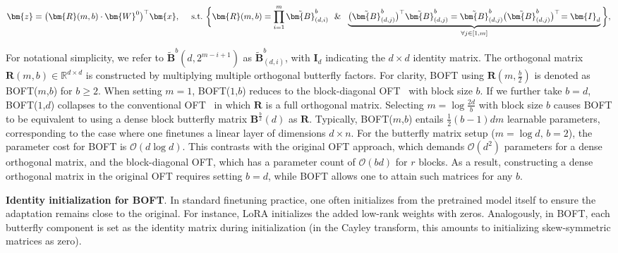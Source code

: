 \begin{equation}
    \begin{aligned}\nonumber
    \bm{z} = \big(\bm{R}(m,b)\cdot\bm{W}^0\big)^\top\bm{x},~~~~\text{s.t.}~\bigg{\{}\bm{R}(m,b) = \prod_{i=1}^m \tilde{\bm{B}}^b_{(d,i)}~~\&~~\underbrace{\big(\tilde{\bm{B}}^b_{(d,j)}\big)^\top\tilde{\bm{B}}^b_{(d,j)}=\tilde{\bm{B}}^b_{(d,j)}\big(\tilde{\bm{B}}^b_{(d,j)}\big)^\top\!=\bm{I}_d}_{\forall j\in [1, m]}\bigg{\}},
    \end{aligned}
\end{equation}

For notational simplicity, we refer to $\tilde{\bm{B}}^b(d,2^{m-i+1})$ as $\tilde{\bm{B}}^b_{(d,i)}$, with $\bm{I}_d$ indicating the $d\times d$ identity matrix. The orthogonal matrix $\bm{R}(m,b)\in\mathbb{R}^{d\times d}$ is constructed by multiplying multiple orthogonal butterfly factors. For clarity, BOFT using $\bm{R}(m,\frac{b}{2})$ is denoted as BOFT($m$,$b$) for $b\geq 2$. When setting $m=1$, BOFT($1$,$b$) reduces to the block-diagonal OFT~\cite{qiu2023controlling} with block size $b$. If we further take $b=d$, BOFT($1$,$d$) collapses to the conventional OFT~\cite{qiu2023controlling} in which $\bm{R}$ is a full orthogonal matrix. Selecting $m=\log \frac{2d}{b}$ with block size $b$ causes BOFT to be equivalent to using a dense block butterfly matrix $\bm{B}^{\frac{b}{2}}(d)$ as $\bm{R}$. Typically, BOFT($m$,$b$) entails $\frac{1}{2}(b-1)dm$ learnable parameters, corresponding to the case where one finetunes a linear layer of dimensions $d\times n$. For the butterfly matrix setup ($m=\log d,\,b=2$), the parameter cost for BOFT is $\mathcal{O}(d\log d)$. This contrasts with the original OFT approach, which demands $\mathcal{O}(d^2)$ parameters for a dense orthogonal matrix, and the block-diagonal OFT, which has a parameter count of $\mathcal{O}(bd)$ for $r$ blocks. As a result, constructing a dense orthogonal matrix in the original OFT requires setting $b=d$, while BOFT allows one to attain such matrices for any $b$.

\textbf{Identity initialization for BOFT}. In standard finetuning practice, one often initializes from the pretrained model itself to ensure the adaptation remains close to the original. For instance, LoRA initializes the added low-rank weights with zeros. Analogously, in BOFT, each butterfly component is set as the identity matrix during initialization (in the Cayley transform, this amounts to initializing skew-symmetric matrices as zero).

